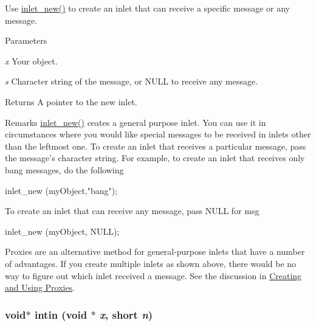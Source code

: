 Use \hyperlink{group__inout_ga7195144cee5e8b74c10c2b17b6c6472a}{inlet\_\-new()} to create an inlet that can receive a specific message or any message. 
\begin{DoxyParams}{Parameters}
\item[{\em x}]Your object. \item[{\em s}]Character string of the message, or NULL to receive any message. \end{DoxyParams}
\begin{DoxyReturn}{Returns}
A pointer to the new inlet.
\end{DoxyReturn}
\begin{DoxyRemark}{Remarks}
\hyperlink{group__inout_ga7195144cee5e8b74c10c2b17b6c6472a}{inlet\_\-new()} ceates a general purpose inlet. You can use it in circumstances where you would like special messages to be received in inlets other than the leftmost one. To create an inlet that receives a particular message, pass the message’s character string. For example, to create an inlet that receives only bang messages, do the following 
\begin{DoxyCode}
    inlet_new (myObject,"bang"); 
\end{DoxyCode}


To create an inlet that can receive any message, pass NULL for msg 
\begin{DoxyCode}
    inlet_new (myObject, NULL); 
\end{DoxyCode}


Proxies are an alternative method for general-\/purpose inlets that have a number of advantages. If you create multiple inlets as shown above, there would be no way to figure out which inlet received a message. See the discussion in \hyperlink{chapter_inout_chapter_inout_proxies}{Creating and Using Proxies}. 
\end{DoxyRemark}
\hypertarget{group__inout_ga8ca68c8eafef51622f263f13e047341b}{
\subsubsection[{intin}]{\setlength{\rightskip}{0pt plus 5cm}void$\ast$ intin (void $\ast$ {\em x}, \/  short {\em n})}}
\label{group__inout_ga8ca68c8eafef51622f263f13e047341b}


